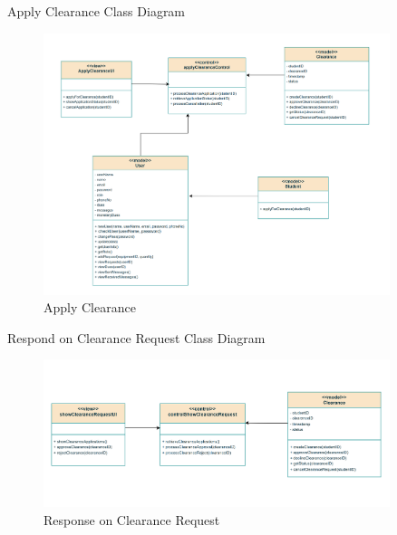 \documentclass[20pt]{beamer}
\numberwithin{figure}{section}
\begin{document}
\begin{frame}{Apply Clearance Class Diagram}

     \begin{figure}
        \centering
        \includegraphics[width= 0.9\textwidth , height= 0.8\paperheight]{ApplyClearanceUML.png}
        \caption{{Apply Clearance}}
        \label{fig:11}
    \end{figure}

\end{frame}

\begin{frame}{Respond on Clearance Request Class Diagram}

     \begin{figure}
        \centering
        \includegraphics[width= 0.9\textwidth , height= 0.6\paperheight]{ResponseClearanceRequestsUML.png}
        \caption{Response on Clearance Request}
        \label{fig:12}
    \end{figure}

\end{frame}
\end{document}
